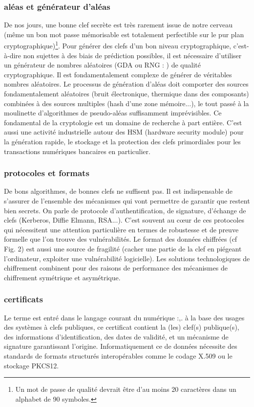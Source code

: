 \subsubsection{ aléas et générateur d'aléas}
De nos jours, une bonne clef secrète est très rarement issue de notre cerveau (même un bon mot passe mémorisable est totalement perfectible sur le pur plan cryptographique)\footnote{Un mot de passe de qualité devrait être d'au moins 20 caractères dans un alphabet de 90 symboles.}. Pour générer des clefs d'un bon niveau cryptographique, c'est-à-dire non sujettes à des biais de prédiction possibles, il est nécessaire d'utiliser un générateur de nombres aléatoires (GDA ou RNG : ) de qualité cryptographique. Il est fondamentalement complexe de générer de véritables nombres aléatoires. Le processus de génération d'aléas doit comporter des sources fondamentalement aléatoires (bruit électronique, thermique dans des composants) combinées à des sources multiples (hash d'une zone mémoire...), le tout passé à la moulinette d'algorithmes de pseudo-aléas suffisamment imprévisibles. Ce fondamental de la cryptologie est un domaine de recherche à part entière. C'est aussi une activité industrielle autour des HSM (hardware security module) pour la génération rapide, le stockage et la protection des clefs primordiales pour les transactions numériques bancaires en particulier.
\subsubsection{ protocoles et formats}
De bons algorithmes, de bonnes clefs ne suffisent pas. Il est indispensable de s'assurer de l'ensemble des mécanismes qui vont permettre de garantir que restent bien secrets. On parle de protocole d'authentification, de signature, d'échange de clefs (Kerberos, Diffie
Elmann, RSA...). C'est souvent au cœur de ces protocoles qui nécessitent une attention particulière en termes de robustesse et de preuve formelle que l'on trouve des vulnérabilités. Le format des données chiffrées (cf Fig. 2) est aussi une source de fragilité (cacher une partie de la clef en piégeant l'ordinateur, exploiter une vulnérabilité logicielle). Les solutions technologiques de chiffrement combinent pour des raisons de performance des mécanismes de chiffrement symétrique et asymétrique.
\subsubsection{certificats}
Le terme est entré dans le langage courant du numérique :,. à la base des usages des systèmes à clefs publiques, ce certificat contient la (les) clef(s) publique(s), des informations d'identification, des dates de validité, et un mécanisme de signature garantissant l'origine. Informatiquement ce de données nécessite des standards de formats structurés interopérables comme le codage X.509 ou le stockage PKCS12.

